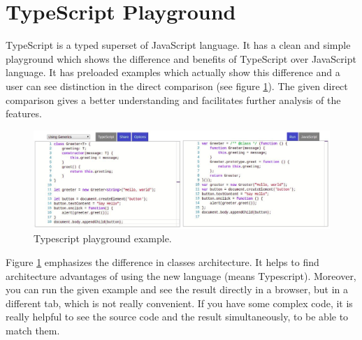 \section{TypeScript Playground} \label{sec:typescript}
TypeScript \cite{TypeScript, jansen2018learning} is a typed superset of JavaScript language. It has a clean and simple playground which shows the difference and benefits of TypeScript over JavaScript language. It has preloaded examples which actually show this difference and a user can see distinction in the direct comparison (see figure \ref{fig:typescript}). The given direct comparison gives a better understanding and facilitates further analysis of the features.
\begin{figure}[h!]
    \centering
    \includegraphics[width=\linewidth]{src/pic/typescript}
    \caption{Typescript playground example.}
    \label{fig:typescript}
\end{figure} \newline
Figure \ref{fig:typescript} emphasizes the difference in classes architecture. It helps to find architecture advantages of using the new language (means Typescript). Moreover, you can run the given example and see the result directly in a browser, but in a different tab, which is not really convenient. If you have some complex code, it is really helpful to see the source code and the result simultaneously, to be able to match them.


